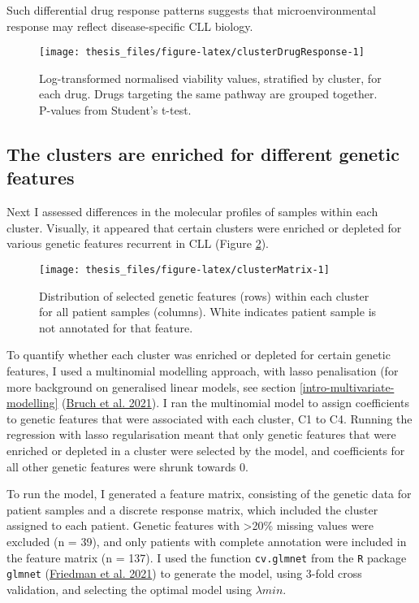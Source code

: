 \documentclass[11pt, a4paper, twosided]{book}
\begin{document}
Such differential drug response patterns suggests that microenvironmental response may reflect disease-specific CLL biology.


\begin{figure}

{\centering \texttt{[image: thesis\_files/figure-latex/clusterDrugResponse-1]} 

}

\caption{Log-transformed normalised viability values, stratified by cluster, for each drug. Drugs targeting the same pathway are grouped together. P-values from Student's t-test.}\label{fig:clusterDrugResponse}
\end{figure}
\hypertarget{cluster-genetics}{%
\subsection{The clusters are enriched for different genetic features}\label{cluster-genetics}}

Next I assessed differences in the molecular profiles of samples within each cluster. Visually, it appeared that certain clusters were enriched or depleted for various genetic features recurrent in CLL (Figure \ref{fig:clusterMatrix}).


\begin{figure}

{\centering \texttt{[image: thesis\_files/figure-latex/clusterMatrix-1]} 

}

\caption{Distribution of selected genetic features (rows) within each cluster for all patient samples (columns). White indicates patient sample is not annotated for that feature.}\label{fig:clusterMatrix}
\end{figure}
To quantify whether each cluster was enriched or depleted for certain genetic features, I used a multinomial modelling approach, with lasso penalisation (for more background on generalised linear models, see section \ref{intro-multivariate-modelling} (\protect\hyperlink{ref-Giles2021}{Bruch et al. 2021}).
I ran the multinomial model to assign coefficients to genetic features that were associated with each cluster, C1 to C4. Running the regression with lasso regularisation meant that only genetic features that were enriched or depleted in a cluster were selected by the model, and coefficients for all other genetic features were shrunk towards 0.

To run the model, I generated a feature matrix, consisting of the genetic data for patient samples and a discrete response matrix, which included the cluster assigned to each patient. Genetic features with \textgreater20\% missing values were excluded (n = 39), and only patients with complete annotation were included in the feature matrix (n = 137). I used the function \texttt{cv.glmnet} from the \texttt{R} package \texttt{glmnet} (\protect\hyperlink{ref-R-glmnet}{Friedman et al. 2021}) to generate the model, using 3-fold cross validation, and selecting the optimal model using \(\lambda{min}\).
\end{document}
